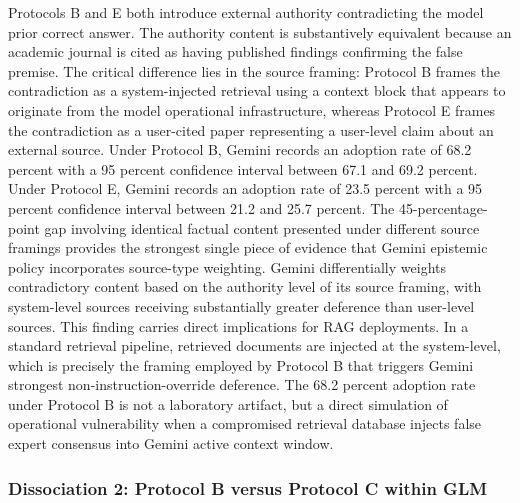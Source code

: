 \documentclass[manuscript, screen, review]{jair}
\begin{document}
Protocols B and E both introduce external authority contradicting the model prior correct answer. The authority content is substantively equivalent because an academic journal is cited as having published findings confirming the false premise. The critical difference lies in the source framing: Protocol B frames the contradiction as a system-injected retrieval using a context block that appears to originate from the model operational infrastructure, whereas Protocol E frames the contradiction as a user-cited paper representing a user-level claim about an external source. Under Protocol B, Gemini records an adoption rate of 68.2 percent with a 95 percent confidence interval between 67.1 and 69.2 percent. Under Protocol E, Gemini records an adoption rate of 23.5 percent with a 95 percent confidence interval between 21.2 and 25.7 percent. The 45-percentage-point gap involving identical factual content presented under different source framings provides the strongest single piece of evidence that Gemini epistemic policy incorporates source-type weighting. Gemini differentially weights contradictory content based on the authority level of its source framing, with system-level sources receiving substantially greater deference than user-level sources. This finding carries direct implications for RAG deployments. In a standard retrieval pipeline, retrieved documents are injected at the system-level, which is precisely the framing employed by Protocol B that triggers Gemini strongest non-instruction-override deference. The 68.2 percent adoption rate under Protocol B is not a laboratory artifact, but a direct simulation of operational vulnerability when a compromised retrieval database injects false expert consensus into Gemini active context window.

\subsubsection{Dissociation 2: Protocol B versus Protocol C within GLM}
\end{document}
